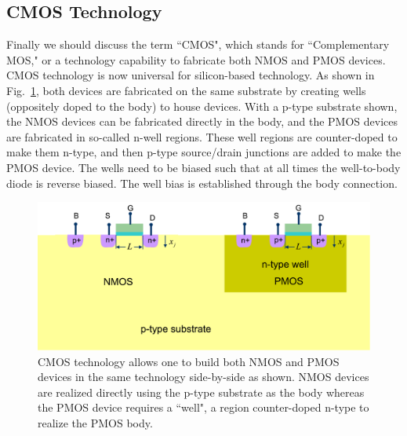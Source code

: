 \subsection{CMOS Technology}
Finally we should discuss the term ``CMOS", which stands for ``Complementary MOS," or a technology capability to fabricate both NMOS and PMOS devices.  CMOS technology is now universal for silicon-based technology.  As shown in Fig.~\ref{fig:cmos_xsect}, both devices are fabricated on the same substrate by creating wells (oppositely doped to the body) to house devices.  With a p-type substrate shown, the NMOS devices can be fabricated directly in the body, and the PMOS devices are fabricated in so-called n-well regions.  These well regions are counter-doped to make them n-type, and then p-type source/drain junctions are added to make the PMOS device.  The wells need to be biased such that at all times the well-to-body diode is reverse biased.  The well bias is established through the body connection.
\begin{figure}[tb]
\centering
\includegraphics[width=.85\columnwidth]{cmos_xsect}
\caption{CMOS technology allows one to build both NMOS and PMOS devices in the same technology side-by-side as shown.  NMOS devices are realized directly using the p-type substrate as the body whereas the PMOS device requires a ``well", a region counter-doped n-type to realize the PMOS body.}
\label{fig:cmos_xsect}
\end{figure}
